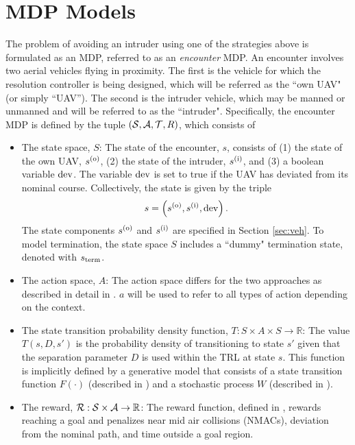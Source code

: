 \section{MDP Models}\label{sec:uavmodel}

The problem of avoiding an intruder using one of the strategies above is formulated as an MDP, referred to as an \emph{encounter} MDP. An encounter involves two aerial vehicles flying in proximity. The first is the vehicle for which the resolution controller is being designed, which will be referred as the ``own UAV" (or simply ``UAV''). The second is the intruder vehicle, which may be manned or unmanned and will be referred to as the ``intruder". Specifically, the encounter MDP is defined by the tuple $(\mathcal{S}, \mathcal{A}, \mathcal{T}, R)$, which consists of

\begin{itemize}
    \item The state space, $S$: The state of the encounter, $s$, consists of (1) the state of the own UAV, $s^{(\mathrm{o})}$, (2) the state of the intruder, $s^{(\mathrm{i})}$, and (3) a boolean variable $\mathrm{dev }$. The variable $\mathrm{dev }$ is set to true if the UAV has deviated  from its nominal course. Collectively, the state is given by the triple
        \begin{equation}
            s = \left(s^{(\mathrm{o})}, s^{(\mathrm{i})}, \mathrm{dev }\right) \text{.}
        \end{equation}
        The state components $s^{(\mathrm{o})}$ and $s^{(\mathrm{i})}$ are specified in Section \ref{sec:veh}.
        To model termination, the state space $S$ includes a ``dummy" termination state, denoted with $s_{\mathrm{term}}$.
    \item The action space, $A$: The action space differs for the two approaches as described in detail in . $a$ will be used to refer to all types of action depending on the context.
    \item The state transition probability density function, $T: S \times A \times S \to \mathbb{R}$: The value $T(s,D,s')$ is the probability density of transitioning to state $s'$ given that the separation parameter $D$ is used within the TRL at state $s$. This function is implicitly defined by a generative model that consists of a state transition function $F(\cdot)$ (described in ) and a stochastic process $W$ (described in ).
    \item The reward, $\mathcal{R}:\mathcal{S} \times \mathcal{A} \to \mathbb{R}$: The reward function, defined in , rewards reaching a goal and penalizes near mid air collisions (NMACs), deviation from the nominal path, and time outside a goal region.
\end{itemize}

